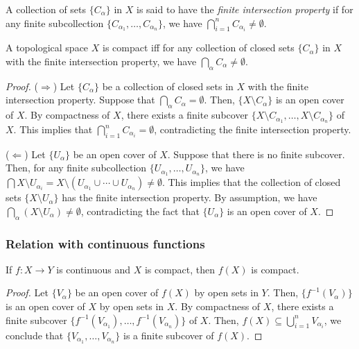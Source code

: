 \begin{definition}
    A collection of sets $\{C_\alpha\}$ in $X$ is said to have the \emph{finite intersection property} if for any finite subcollection $\{C_{\alpha_1},\ldots,C_{\alpha_n}\}$, we have $\bigcap_{i=1}^n C_{\alpha_i}\ne\emptyset$.
\end{definition}

\begin{theorem}
    A topological space $X$ is compact iff for any collection of closed sets $\{C_\alpha\}$ in $X$ with the finite intersection property, we have $\bigcap_\alpha C_\alpha\ne\emptyset$.
\end{theorem}
\begin{proof}
    (\(\Rightarrow\)) Let $\{C_\alpha\}$ be a collection of closed sets in $X$ with the finite intersection property. Suppose that $\bigcap_\alpha C_\alpha=\emptyset$. Then, $\{X\setminus C_\alpha\}$ is an open cover of $X$. By compactness of $X$, there exists a finite subcover $\{X\setminus C_{\alpha_1},\ldots,X\setminus C_{\alpha_n}\}$ of $X$. This implies that $\bigcap_{i=1}^n C_{\alpha_i}=\emptyset$, contradicting the finite intersection property.

    (\(\Leftarrow\)) Let $\{U_\alpha\}$ be an open cover of $X$. Suppose that there is no finite subcover. Then, for any finite subcollection $\{U_{\alpha_1},\ldots,U_{\alpha_n}\}$, we have $\bigcap X\setminus U_{\alpha_i}=X\setminus (U_{\alpha_1}\cup\cdots\cup U_{\alpha_n})\ne\emptyset$. This implies that the collection of closed sets $\{X\setminus U_\alpha\}$ has the finite intersection property. By assumption, we have $\bigcap_\alpha (X\setminus U_\alpha)\ne\emptyset$, contradicting the fact that $\{U_\alpha\}$ is an open cover of $X$.
\end{proof}


\subsubsection*{Relation with continuous functions}

\begin{theorem}
    If $f:X\to Y$ is continuous and $X$ is compact, then $f(X)$ is compact.
\end{theorem}
\begin{proof}
    Let $\{V_\alpha\}$ be an open cover of $f(X)$ by open sets in $Y$. Then, $\{f^{-1}(V_\alpha)\}$ is an open cover of $X$ by open sets in $X$. By compactness of $X$, there exists a finite subcover $\{f^{-1}(V_{\alpha_1}),\ldots,f^{-1}(V_{\alpha_n})\}$ of $X$. Then, $f(X)\subseteq \bigcup_{i=1}^n V_{\alpha_i}$, we conclude that $\{V_{\alpha_1},\ldots,V_{\alpha_n}\}$ is a finite subcover of $f(X)$.
\end{proof}

